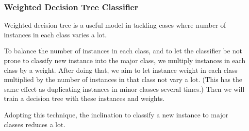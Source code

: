 \documentclass[english]{article}
\begin{document}
\subsubsection{Weighted Decision Tree Classifier}
\label{weightdtc}
\par Weighted decision tree is a useful model in tackling cases where number of instances in each class varies a lot.
\par To balance the number of instances in each class, and to let the classifier be not prone to classify new instance into the major class, we multiply instances in each class by a weight. After doing that, we aim to let instance weight in each class multiplied by the number of instances in that class not vary a lot. (This has the same effect as duplicating instances in minor classes several times.) Then we will train a decision tree with these instances and weights.
\par Adopting this technique, the inclination to classify a new instance to major classes reduces a lot.
\end{document}
